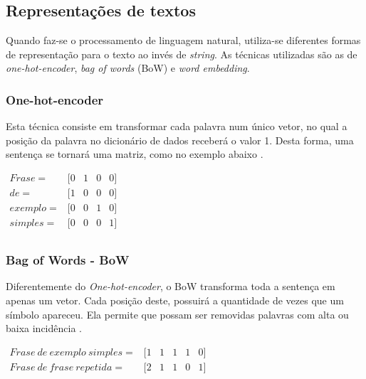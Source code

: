 \subsection{Representações de textos}

Quando faz-se o processamento de linguagem natural, utiliza-se diferentes formas de representação para o texto ao invés de \textit{string}. As técnicas utilizadas são as de \textit{one-hot-encoder}, \textit{bag of words} (BoW) e \textit{word embedding}.

\subsubsection{One-hot-encoder}

Esta técnica consiste em transformar cada palavra num único vetor, no qual a posição da palavra no dicionário de dados receberá o valor 1. Desta forma, uma sentença se tornará uma matriz, como no exemplo abaixo \cite{brink_real-world_2015}.

\begin{center}
    $
    \begin{array}{rcccc}
        Frase = & [ 0 & 1 & 0 & 0 ]  \\
        de  = & [ 1 & 0 & 0 & 0 ]  \\
        exemplo = & [ 0 & 0 & 1 & 0 ]  \\
        simples = & [ 0 & 0 & 0 & 1 ]  \\
    \end{array}
  	$
\end{center}

\subsubsection{Bag of Words - BoW}

Diferentemente do \textit{One-hot-encoder}, o BoW transforma toda a sentença em apenas um vetor. Cada posição deste, possuirá a quantidade de vezes que um símbolo apareceu. Ela permite que possam ser removidas palavras com alta ou baixa incidência \cite{brink_real-world_2015}.

\begin{center}
    $
    \begin{array}{rccccc}
        \label{ex:bow}
        Frase\ de\ exemplo\ simples = & [ 1 & 1 & 1 & 1 & 0]  \\
        Frase\ de\ frase\ repetida = & [ 2 & 1 & 1 & 0 & 1]  \\
    \end{array}
  	$
\end{center}

